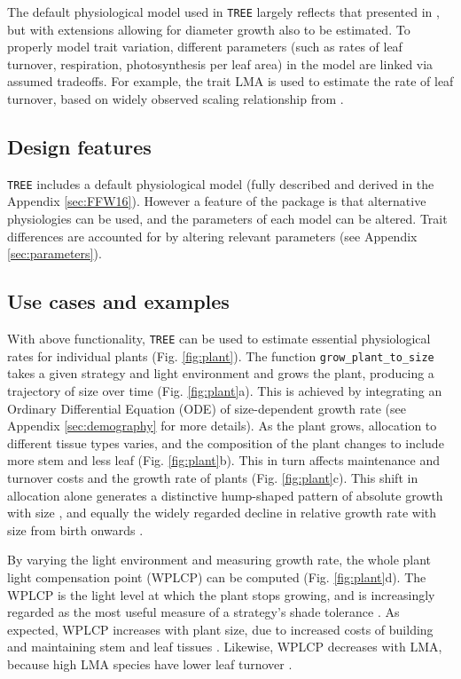 \documentclass[a4paper,11pt]{article}
\begin{document}
The default physiological model used in \texttt{TREE} largely reflects that
presented in \citet{Falster-2011}, but with extensions allowing for diameter
growth also to be estimated. To properly model trait variation,
different parameters (such as rates of leaf turnover, respiration, photosynthesis 
per leaf area) in the model are linked via assumed tradeoffs. For
example, the trait LMA is used to estimate the rate of leaf turnover,
based on widely observed scaling relationship from \citet{Wright-2004}.

\subsection{Design features}

\texttt{TREE} includes a default physiological model (fully described and derived
in the Appendix \ref{sec:FFW16}). However a feature of the package is that alternative
physiologies can be used, and the parameters of each model can be
altered. Trait differences are accounted for by altering relevant
parameters (see Appendix \ref{sec:parameters}).

\subsection{Use cases and examples}

With above functionality, \texttt{TREE} can be used to estimate essential
physiological rates for individual plants (Fig. \ref{fig:plant}). The
function \texttt{grow\_plant\_to\_size} takes a given strategy and light
environment and grows the plant, producing a trajectory of size over
time (Fig. \ref{fig:plant}a). This is achieved by integrating an
Ordinary Differential Equation (ODE) of size-dependent growth rate (see
Appendix \ref{sec:demography} for more
details). As the plant grows, allocation to different tissue types varies, and
the composition of the plant changes to include more stem and less
leaf (Fig. \ref{fig:plant}b). This in turn affects maintenance and
turnover costs and the growth rate of plants (Fig. \ref{fig:plant}c).
This shift in allocation alone generates a distinctive hump-shaped pattern of absolute
growth with size \citep{King-2011}, and equally the widely regarded
decline in relative growth rate with size from birth onwards
\citep{Enquist-2007}.

By varying the light environment and measuring growth rate, the whole
plant light compensation point (WPLCP) can be computed (Fig.
\ref{fig:plant}d). The WPLCP is the light level at which the plant 
stops growing, and is increasingly regarded as the most useful
measure of a strategy's shade tolerance
\citep{Givnish-1988, Baltzer-2007, Lusk-2013}. As expected, WPLCP
increases with plant size, due to increased costs of building and
maintaining stem and leaf tissues \citep{Givnish-1988}. Likewise, WPLCP
decreases with LMA, because high LMA species have lower leaf turnover
\citep{Baltzer-2007, Lusk-2013}.
\end{document}
